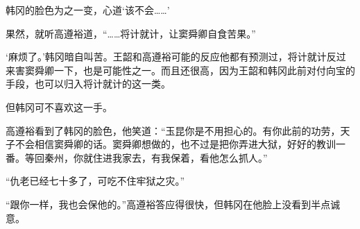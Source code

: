 韩冈的脸色为之一变，心道‘该不会……’

果然，就听高遵裕道，“……将计就计，让窦舜卿自食苦果。”

‘麻烦了。’韩冈暗自叫苦。王韶和高遵裕可能的反应他都有预测过，将计就计反过来害窦舜卿一下，也是可能性之一。而且还很高，因为王韶和韩冈此前对付向宝的手段，也可以归入将计就计的这一类。

但韩冈可不喜欢这一手。

高遵裕看到了韩冈的脸色，他笑道：“玉昆你是不用担心的。有你此前的功劳，天子不会相信窦舜卿的话。窦舜卿想做的，也不过是把你弄进大狱，好好的教训一番。等回秦州，你就住进我家去，有我保着，看他怎么抓人。”

“仇老已经七十多了，可吃不住牢狱之灾。”

“跟你一样，我也会保他的。”高遵裕答应得很快，但韩冈在他脸上没看到半点诚意。

